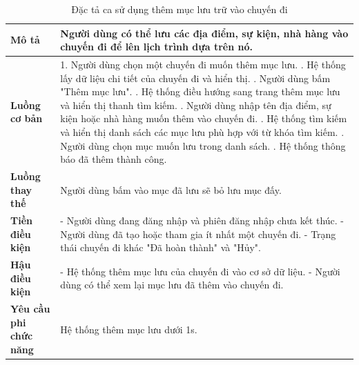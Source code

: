 \begin{longtable}{| p{4cm} | p{\dimexpr\linewidth-4cm-4\tabcolsep} |} %
    \caption{Đặc tả ca sử dụng thêm mục lưu trữ vào chuyến đi} %
    \label{tab:uc_add_saved_item_spec} \\ %

    \hline
    \textbf{Mô tả} & Người dùng có thể lưu các địa điểm, sự kiện, nhà hàng vào chuyến đi để lên lịch trình dựa trên nó. \\
    \hline
    \endfirsthead %



    \hline %
    \endlastfoot

    \textbf{Luồng cơ bản} & 1. Người dùng chọn một chuyến đi muốn thêm mục lưu. \newline
                           2. Hệ thống lấy dữ liệu chi tiết của chuyến đi và hiển thị. \newline
                           3. Người dùng bấm "Thêm mục lưu". \newline
                           4. Hệ thống điều hướng sang trang thêm mục lưu và hiển thị thanh tìm kiếm. \newline
                           5. Người dùng nhập tên địa điểm, sự kiện hoặc nhà hàng muốn thêm vào chuyến đi. \newline
                           6. Hệ thống tìm kiếm và hiển thị danh sách các mục lưu phù hợp với từ khóa tìm kiếm. \newline
                           7. Người dùng chọn mục muốn lưu trong danh sách. \newline
                           8. Hệ thống thông báo đã thêm thành công. \\
    \hline
    \textbf{Luồng thay thế} & Người dùng bấm vào mục đã lưu sẽ bỏ lưu mục đấy. \\
    \hline
    \textbf{Tiền điều kiện} & - Người dùng đang đăng nhập và phiên đăng nhập chưa kết thúc.\newline
                           - Người dùng đã tạo hoặc tham gia ít nhất một chuyến đi. \newline
                           - Trạng thái chuyến đi khác "Đã hoàn thành" và "Hủy". \\
    \hline
    \textbf{Hậu điều kiện} & - Hệ thống thêm mục lưu của chuyến đi vào cơ sở dữ liệu.\newline
                           - Người dùng có thể xem lại mục lưu đã thêm vào chuyến đi. \\
    \hline
    \textbf{Yêu cầu phi chức năng} & Hệ thống thêm mục lưu dưới 1s. \\

\end{longtable}



